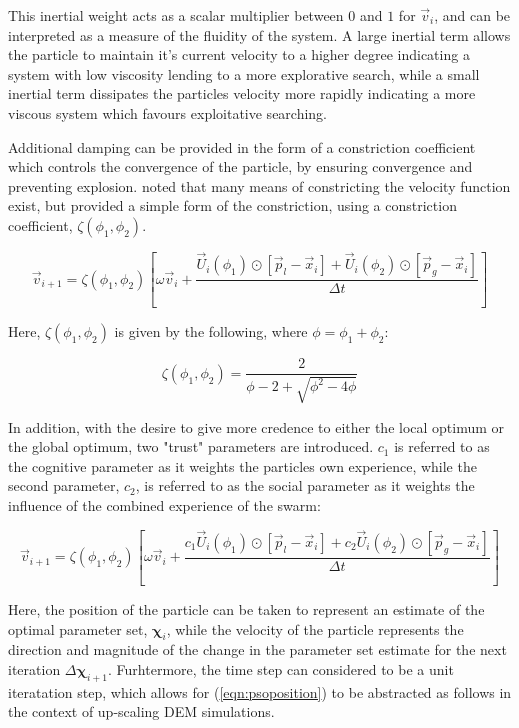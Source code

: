 This inertial weight acts as a scalar multiplier between $0$ and $1$ for $\vec{v}_i$, and can be interpreted as a measure of the fluidity of the system. A large inertial term allows the particle to maintain it's current velocity to a higher degree indicating a system with low viscosity lending to a more explorative search, while a small inertial term dissipates the particles velocity more rapidly indicating a more viscous system which favours exploitative searching. 

Additional damping can be provided in the form of a constriction coefficient which controls the convergence of the particle, by ensuring convergence and preventing explosion. \citet{Clerc_2002} noted that many means of constricting the velocity function exist, but provided a simple form of the constriction, using a constriction coefficient, $\zeta\left(\phi_1, \phi_2\right)$. 

\begin{equation}
\vec{v}_{i+1} = \zeta\left(\phi_1, \phi_2\right) \left[\omega\vec{v}_i + \frac{\vec{U}_i\left(\phi_1\right)\odot\left[\vec{p}_l-\vec{x}_i\right] + \vec{U}_i\left(\phi_2\right)\odot\left[\vec{p}_g-\vec{x}_i\right]}{\Delta t}\right]
\label{eqn:psoconstriction}
\end{equation}

Here, $\zeta\left(\phi_1, \phi_2\right)$ is given by the following, where $\phi=\phi_1+\phi_2$:

\begin{equation}
\zeta\left(\phi_1, \phi_2\right) = \frac{2}{\phi-2+\sqrt{\phi^2-4\phi}}
\label{eqn:psoconstriction2}
\end{equation}

In addition, with the desire to give more credence to either the local optimum or the global optimum, two "trust" parameters are introduced. $c_1$ is referred to as the cognitive parameter as it weights the particles own experience, while the second parameter, $c_2$, is referred to as the social parameter as it weights the influence of the combined experience of the swarm:

\begin{equation}
\vec{v}_{i+1} = \zeta\left(\phi_1, \phi_2\right) \left[\omega\vec{v}_i + \frac{c_1\vec{U}_i\left(\phi_1\right)\odot\left[\vec{p}_l-\vec{x}_i\right] + c_2\vec{U}_i\left(\phi_2\right)\odot\left[\vec{p}_g-\vec{x}_i\right]}{\Delta t}\right]
\label{eqn:psoposition}
\end{equation}

Here, the position of the particle can be taken to represent an estimate of the optimal parameter set, $\boldsymbol{\chi}_i$, while the velocity of the particle represents the direction and magnitude of the change in the parameter set estimate for the next iteration $\Delta\boldsymbol{\chi}_{i+1}$. Furhtermore, the time step can considered to be a unit iteratation step, which allows for (\ref{eqn:psoposition}) to be abstracted as follows in the context of up-scaling DEM simulations.


